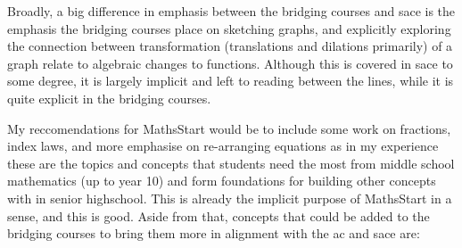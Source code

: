 \documentclass[twoside,12pt,a4paper]{report}
\begin{document}
Broadly, a big difference in emphasis between the bridging courses and \gls{sace} is the emphasis the bridging courses place on sketching graphs, and explicitly exploring the connection between transformation (translations and dilations primarily) of a graph relate to algebraic changes to functions. Although this is covered in \gls{sace} to some degree, it is largely implicit and left to reading between the lines, while it is quite explicit in the bridging courses. 

My reccomendations for MathsStart would be to include some work on fractions, index laws, and more emphasise on re-arranging equations  as in my experience these are the topics and concepts that students need the most from middle school mathematics (up to year 10) and form foundations for building other concepts with in senior highschool. This is already the implicit purpose of MathsStart in a sense, and this is good. Aside from that, concepts that could be added to the bridging courses to bring them more in alignment with the \gls{ac} and \gls{sace} are:
\end{document}

